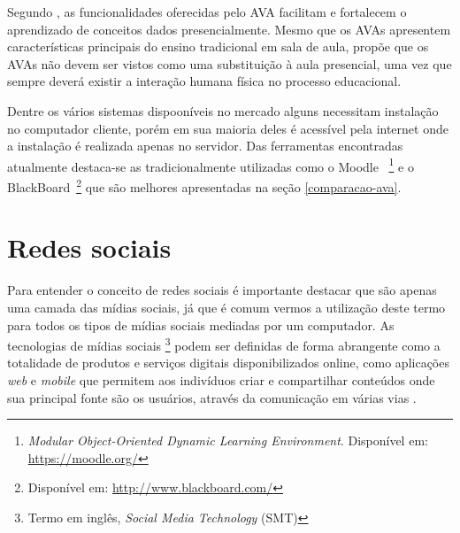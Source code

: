 Segundo , as funcionalidades oferecidas pelo AVA facilitam e fortalecem o aprendizado de conceitos dados presencialmente. Mesmo que os AVAs apresentem características principais do ensino tradicional em sala de aula,  propõe que os AVAs não devem ser vistos como uma substituição à aula presencial, uma vez que sempre deverá existir a interação humana física no processo educacional.

Dentre os vários sistemas dispooníveis no mercado alguns necessitam instalação no computador cliente, porém em sua maioria deles é acessível pela internet onde a instalação é realizada apenas no servidor. Das ferramentas encontradas atualmente destaca-se as tradicionalmente utilizadas como o Moodle ~\footnote{\textit{Modular Object-Oriented Dynamic Learning Environment}. Disponível em: \url{https://moodle.org/}} e o BlackBoard~\footnote{Disponível em: \url{http://www.blackboard.com/}} que são melhores apresentadas na seção \ref{comparacao-ava}.
%
%
%
\section{Redes sociais}
\label{rede-social}

Para entender o conceito de redes sociais é importante destacar que são apenas uma camada das mídias sociais, já que é comum vermos a utilização deste termo para todos os tipos de mídias sociais mediadas por um computador. As tecnologias de mídias sociais \footnote{Termo em inglês, \textit{Social Media Technology} (SMT)} podem ser definidas de forma abrangente como a totalidade de produtos e serviços digitais disponibilizados online, como aplicações \textit{web} e \textit{mobile} que permitem aos indivíduos criar e compartilhar conteúdos onde sua principal fonte são os usuários, através da comunicação em várias vias \cite{davis2012social}.

